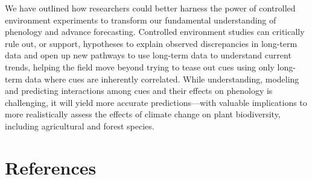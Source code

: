 \documentclass[11pt,letter]{article}
\begin{document}
We have outlined how researchers could better harness the power of controlled environment experiments to transform our fundamental understanding of phenology and advance forecasting. Controlled environment studies can critically rule out, or support, hypotheses to explain observed discrepancies in long-term data and open up new pathways to use long-term data to understand current trends, helping the field move beyond trying to tease out cues using only long-term data where cues are inherently correlated. While understanding, modeling and predicting interactions among cues and their effects on phenology is challenging, it will yield more accurate predictions---with valuable implications to more realistically assess the effects of climate change on plant biodiversity, including agricultural and forest species. 

\clearpage

\section{References}


\clearpage
\end{document}

